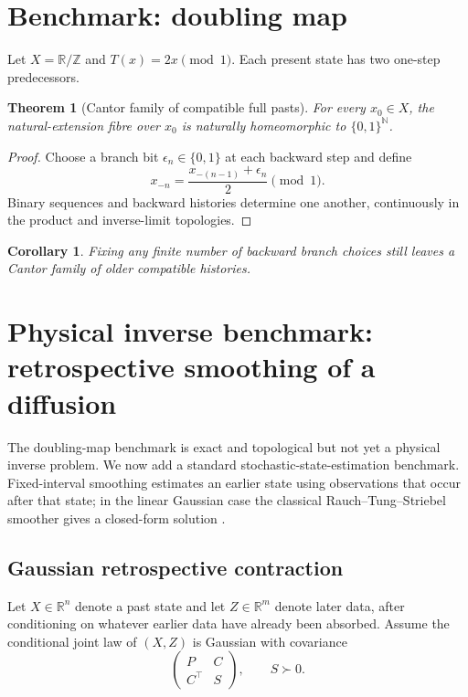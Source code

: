 \documentclass[11pt]{article}
\newtheorem{theorem}[definition]{Theorem}
\newtheorem{corollary}[definition]{Corollary}
\begin{document}
\section{Benchmark: doubling map}
Let $X=\mathbb R/\mathbb Z$ and $T(x)=2x\pmod1$. Each present state has two one-step predecessors.
\begin{theorem}[Cantor family of compatible full pasts]
For every $x_0\in X$, the natural-extension fibre over $x_0$ is naturally homeomorphic to $\{0,1\}^{\mathbb N}$.
\end{theorem}
\begin{proof}
Choose a branch bit $\epsilon_n\in\{0,1\}$ at each backward step and define
\[
x_{-n}=\frac{x_{-(n-1)}+\epsilon_n}{2}\pmod1.
\]
Binary sequences and backward histories determine one another, continuously in the product and inverse-limit topologies.
\end{proof}
\begin{corollary}
Fixing any finite number of backward branch choices still leaves a Cantor family of older compatible histories.
\end{corollary}

\section{Physical inverse benchmark: retrospective smoothing of a diffusion}

The doubling-map benchmark is exact and topological but not yet a physical inverse problem.
We now add a standard stochastic-state-estimation benchmark. Fixed-interval smoothing
estimates an earlier state using observations that occur after that state; in the linear
Gaussian case the classical Rauch--Tung--Striebel smoother gives a closed-form solution
\cite{RauchTungStriebel1965,SarkkaSvensson2023}.

\subsection{Gaussian retrospective contraction}

Let \(X\in\mathbb R^n\) denote a past state and let \(Z\in\mathbb R^m\) denote
later data, after conditioning on whatever earlier data have already been absorbed.
Assume the conditional joint law of \((X,Z)\) is Gaussian with covariance
\[
\begin{pmatrix}
P & C\\
C^\top & S
\end{pmatrix},
\qquad
S\succ0.
\]
\end{document}
